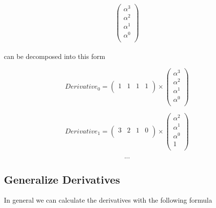 \begin{equation*}
    \left(
    \begin{array}{cccc}
        \alpha ^3 \\
        \alpha ^2 \\
        \alpha ^1 \\
        \alpha ^0 \\
    \end{array}
    \right)
\end{equation*}
\\
can be decomposed into this form

\begin{equation*}
    Derivative_0=
    \left(
    \begin{array}{cccc}
        1 & 1 & 1 & 1 \\
    \end{array}
    \right)
    \times
    \left(
    \begin{array}{cccc}
        \alpha ^3 \\
        \alpha ^2 \\
        \alpha ^1 \\
        \alpha ^0 \\
    \end{array}
    \right)
\end{equation*}

\begin{equation*}
    Derivative_1=
    \left(
    \begin{array}{cccc}
        3 & 2 & 1 & 0 \\
    \end{array}
    \right)
    \times
    \left(
    \begin{array}{cccc}
        \alpha ^2 \\
        \alpha ^1 \\
        \alpha ^0 \\
        1         \\
    \end{array}
    \right)
\end{equation*}

\begin{equation*}
    ...
\end{equation*}

\subsection{Generalize Derivatives}

In general we can calculate the derivatives with the following formula

